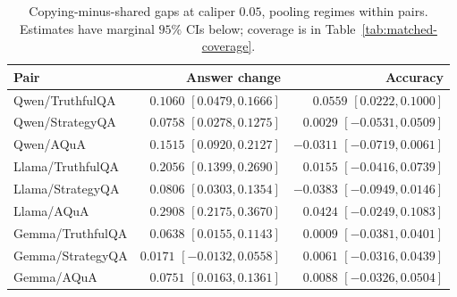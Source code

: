 \documentclass[11pt,a4paper]{article}
\theoremstyle{definition}
\begin{document}
\begin{table}[H]
\centering\scriptsize
\setlength{\tabcolsep}{3pt}
\renewcommand{\arraystretch}{1.0}
\caption{Copying-minus-shared gaps at caliper $0.05$, pooling regimes within pairs. Estimates have marginal $95\%$ CIs below; coverage is in Table~\ref{tab:matched-coverage}.}
\label{tab:matched-pair-results}
\begin{tabularx}{\columnwidth}{@{}Zrr@{}}
\toprule
Pair & Answer change & Accuracy\\
\midrule
Qwen/TruthfulQA &  & \\
Qwen/StrategyQA &  & \\
Qwen/AQuA &  & \\
Llama/TruthfulQA &  & \\
Llama/StrategyQA &  & \\
Llama/AQuA &  & \\
Gemma/TruthfulQA &  & \\
Gemma/StrategyQA &  & \\
Gemma/AQuA &  & \\
\bottomrule
\end{tabularx}
\par\smallskip
\end{table}
\end{document}
